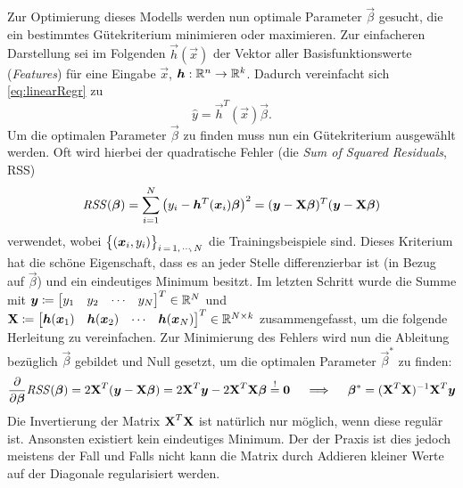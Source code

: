 		Zur Optimierung dieses Modells werden nun optimale Parameter \( \vec{\beta} \) gesucht, die ein bestimmtes Gütekriterium minimieren oder maximieren. Zur einfacheren Darstellung sei im Folgenden \( \vec{h}(\vec{x}) \) der Vektor aller Basisfunktionswerte (\emph{Features}) für eine Eingabe \(\vec{x}\), \dh \( \bm{h} : \mathbb{R}^n \to \mathbb{R}^k \). Dadurch vereinfacht sich \eqref{eq:linearRegr} zu
		\begin{equation}
			\hat{y} = \vec{h}^T(\vec{x}) \vec{\beta}.
		\end{equation}
		Um die optimalen Parameter \( \vec{\beta} \) zu finden muss nun ein Gütekriterium ausgewählt werden. Oft wird hierbei der quadratische Fehler (die \emph{Sum of Squared Residuals}, RSS)
		\begin{equation}
			\mathit{RSS}(\bm{\beta})
				= \sum_{i = 1}^{N} \big( y_i - \bm{h}^T(\bm{x}_i) \bm{\beta} \big)^2
				= (\bm{y} - \bm{\mathrm{X}} \bm{\beta})^T (\bm{y} - \bm{\mathrm{X}} \bm{\beta})
		\end{equation}
		verwendet, wobei \( \big\{ (\bm{x}_i, y_i) \big\}_{i \,=\, 1,\,\cdots\!,\,N} \) die Trainingsbeispiele sind. Dieses Kriterium hat die schöne Eigenschaft, dass es an jeder Stelle differenzierbar ist (in Bezug auf \(\vec{\beta}\)) und ein eindeutiges Minimum besitzt. Im letzten Schritt wurde die Summe mit \( \bm{y} \coloneqq \begin{bmatrix} y_1 & y_2 & \cdots & y_N \end{bmatrix}^T \in \mathbb{R}^N \) und \( \bm{\mathrm{X}} \coloneqq \begin{bmatrix} \bm{h}(\bm{x}_1) & \bm{h}(\bm{x}_2) & \cdots & \bm{h}(\bm{x}_N) \end{bmatrix}^T \in \mathbb{R}^{N \times k} \) zusammengefasst, um die folgende Herleitung zu vereinfachen. Zur Minimierung des Fehlers wird nun die Ableitung bezüglich \(\vec{\beta}\) gebildet und Null gesetzt, um die optimalen Parameter \( \vec{\beta}^\ast \) zu finden:
		\begin{equation}
			\pdv{\bm{\beta}} \mathit{RSS}(\bm{\beta}) = 2 \bm{\mathrm{X}}^T (\bm{y} - \bm{\mathrm{X}} \bm{\beta}) = 2 \bm{\mathrm{X}}^T \bm{y} - 2 \bm{\mathrm{X}}^T \bm{\mathrm{X}} \bm{\beta} \overset{!}{=} \bm{0}
			\quad\implies\quad
			\bm{\beta}^\ast = (\bm{\mathrm{X}}^T \bm{\mathrm{X}})^{-1} \bm{\mathrm{X}}^T \bm{y}
		\end{equation}
		Die Invertierung der Matrix \( \bm{\mathrm{X}}^T \bm{\mathrm{X}} \) ist natürlich nur möglich, wenn diese regulär ist. Ansonsten existiert kein eindeutiges Minimum. Der der Praxis ist dies jedoch meistens der Fall und Falls nicht kann die Matrix durch Addieren kleiner Werte auf der Diagonale regularisiert werden.


